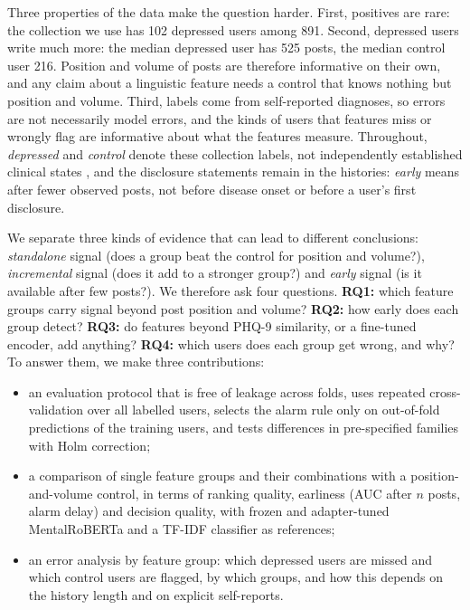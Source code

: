 \documentclass[11pt]{article}
\begin{document}
Three properties of the data make the question harder.
First, positives are rare: the collection we use has 102 depressed users among 891.
Second, depressed users write much more: the median depressed user has 525 posts, the median control user 216.
Position and volume of posts are therefore informative on their own, and any claim about a linguistic feature needs a control that knows nothing but position and volume.
Third, labels come from self-reported diagnoses, so errors are not necessarily model errors, and the kinds of users that features miss or wrongly flag are informative about what the features measure.
Throughout, \emph{depressed} and \emph{control} denote these collection labels, not independently established clinical states \citep{chancellor2020methods}, and the disclosure statements remain in the histories: \emph{early} means after fewer observed posts, not before disease onset or before a user's first disclosure.

We separate three kinds of evidence that can lead to different conclusions: \emph{standalone} signal (does a group beat the control for position and volume?), \emph{incremental} signal (does it add to a stronger group?) and \emph{early} signal (is it available after few posts?).
We therefore ask four questions.
\textbf{RQ1:} which feature groups carry signal beyond post position and volume?
\textbf{RQ2:} how early does each group detect?
\textbf{RQ3:} do features beyond PHQ-9 similarity, or a fine-tuned encoder, add anything?
\textbf{RQ4:} which users does each group get wrong, and why?
To answer them, we make three contributions:
\begin{itemize}\itemsep0pt
\item an evaluation protocol that is free of leakage across folds, uses repeated cross-validation over all labelled users, selects the alarm rule only on out-of-fold predictions of the training users, and tests differences in pre-specified families with Holm correction;
\item a comparison of single feature groups and their combinations with a position-and-volume control, in terms of ranking quality, earliness (AUC after $n$ posts, alarm delay) and decision quality, with frozen and adapter-tuned MentalRoBERTa and a TF-IDF classifier as references;
\item an error analysis by feature group: which depressed users are missed and which control users are flagged, by which groups, and how this depends on the history length and on explicit self-reports.
\end{itemize}
\end{document}
